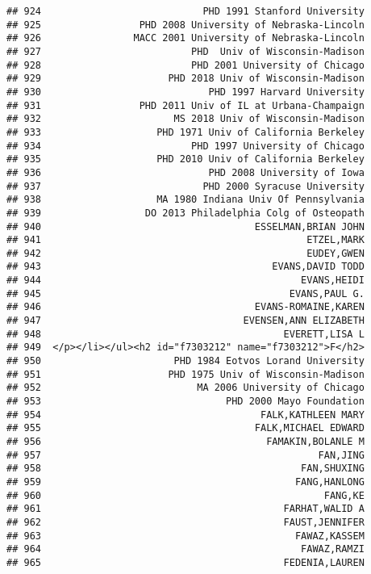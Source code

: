 \documentclass[
]{article}
\begin{document}
\begin{verbatim}
## 924                            PHD 1991 Stanford University
## 925                 PHD 2008 University of Nebraska-Lincoln
## 926                MACC 2001 University of Nebraska-Lincoln
## 927                          PHD  Univ of Wisconsin-Madison
## 928                          PHD 2001 University of Chicago
## 929                      PHD 2018 Univ of Wisconsin-Madison
## 930                             PHD 1997 Harvard University
## 931                 PHD 2011 Univ of IL at Urbana-Champaign
## 932                       MS 2018 Univ of Wisconsin-Madison
## 933                    PHD 1971 Univ of California Berkeley
## 934                          PHD 1997 University of Chicago
## 935                    PHD 2010 Univ of California Berkeley
## 936                             PHD 2008 University of Iowa
## 937                            PHD 2000 Syracuse University
## 938                    MA 1980 Indiana Univ Of Pennsylvania
## 939                  DO 2013 Philadelphia Colg of Osteopath
## 940                                     ESSELMAN,BRIAN JOHN
## 941                                              ETZEL,MARK
## 942                                              EUDEY,GWEN
## 943                                        EVANS,DAVID TODD
## 944                                             EVANS,HEIDI
## 945                                           EVANS,PAUL G.
## 946                                     EVANS-ROMAINE,KAREN
## 947                                   EVENSEN,ANN ELIZABETH
## 948                                          EVERETT,LISA L
## 949  </p></li></ul><h2 id="f7303212" name="f7303212">F</h2>
## 950                       PHD 1984 Eotvos Lorand University
## 951                      PHD 1975 Univ of Wisconsin-Madison
## 952                           MA 2006 University of Chicago
## 953                                PHD 2000 Mayo Foundation
## 954                                      FALK,KATHLEEN MARY
## 955                                     FALK,MICHAEL EDWARD
## 956                                       FAMAKIN,BOLANLE M
## 957                                                FAN,JING
## 958                                             FAN,SHUXING
## 959                                            FANG,HANLONG
## 960                                                 FANG,KE
## 961                                          FARHAT,WALID A
## 962                                          FAUST,JENNIFER
## 963                                            FAWAZ,KASSEM
## 964                                             FAWAZ,RAMZI
## 965                                          FEDENIA,LAUREN

\end{verbatim}
\end{document}
